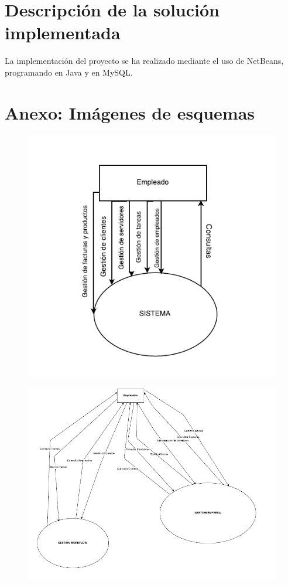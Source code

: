 \documentclass[paper=a4, fontsize=11pt, spanish]{scrartcl}
\begin{document}
\section{Descripción de la solución implementada}
La implementación del proyecto se ha realizado mediante el uso de NetBeans, programando en Java y en MySQL.

\section{Anexo: Imágenes de esquemas}
\newpage
\begin{figure}
	\includegraphics{ERP_EMEGEX.png}
	\caption{}
	\label{fig:cajanegra}
\end{figure}

\begin{figure}
	\includegraphics[width=1.25\textwidth]{ArmazonF.png}
	\caption{}
	\label{fig:armazonF}
\end{figure}
\end{document}
